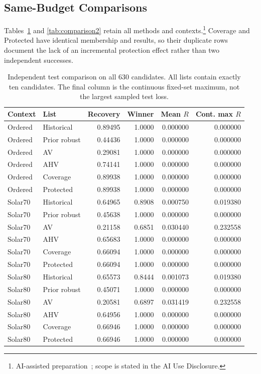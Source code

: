 \documentclass{llncs}
\newcommand{\aidraft}{\footnote{AI-assisted preparation~\cite{openai2026}; scope is stated in the AI Use Disclosure.}}
\begin{document}
\subsection{Same-Budget Comparisons}
Tables~\ref{tab:comparison1} and \ref{tab:comparison2} retain all methods and contexts.\aidraft{} Coverage and Protected have identical membership and results, so their duplicate rows document the lack of an incremental protection effect rather than two independent successes.
\begin{table}[tbp]\centering\small\caption{Independent test comparison on all 630 candidates. All lists contain exactly ten candidates. The final column is the continuous fixed-set maximum, not the largest sampled test loss.}\label{tab:comparison1}
\begin{tabular}{llrrrr}\toprule
Context & List & Recovery & Winner & Mean $R$ & Cont. max $R$\\\midrule
Ordered & Historical & 0.89495 & 1.0000 & 0.000000 & 0.000000\\
Ordered & Prior robust & 0.44436 & 1.0000 & 0.000000 & 0.000000\\
Ordered & AV & 0.29081 & 1.0000 & 0.000000 & 0.000000\\
Ordered & AHV & 0.74141 & 1.0000 & 0.000000 & 0.000000\\
Ordered & Coverage & 0.89938 & 1.0000 & 0.000000 & 0.000000\\
Ordered & Protected & 0.89938 & 1.0000 & 0.000000 & 0.000000\\
Solar70 & Historical & 0.64965 & 0.8908 & 0.000750 & 0.019380\\
Solar70 & Prior robust & 0.45638 & 1.0000 & 0.000000 & 0.000000\\
Solar70 & AV & 0.21158 & 0.6851 & 0.030440 & 0.232558\\
Solar70 & AHV & 0.65683 & 1.0000 & 0.000000 & 0.000000\\
Solar70 & Coverage & 0.66094 & 1.0000 & 0.000000 & 0.000000\\
Solar70 & Protected & 0.66094 & 1.0000 & 0.000000 & 0.000000\\
Solar80 & Historical & 0.65573 & 0.8444 & 0.001073 & 0.019380\\
Solar80 & Prior robust & 0.45071 & 1.0000 & 0.000000 & 0.000000\\
Solar80 & AV & 0.20581 & 0.6897 & 0.031419 & 0.232558\\
Solar80 & AHV & 0.64956 & 1.0000 & 0.000000 & 0.000000\\
Solar80 & Coverage & 0.66946 & 1.0000 & 0.000000 & 0.000000\\
Solar80 & Protected & 0.66946 & 1.0000 & 0.000000 & 0.000000\\
\bottomrule\end{tabular}\end{table}
\end{document}
